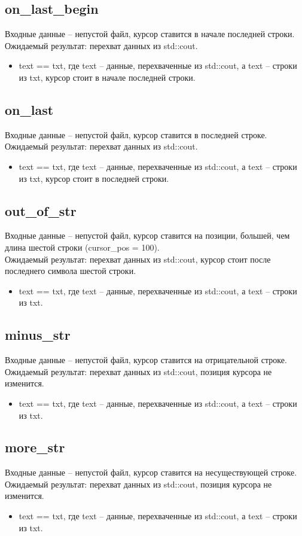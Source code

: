 \documentclass{article}
\begin{document}
\subsection{on\_last\_begin}
Входные данные -- непустой файл, курсор ставится в начале последней строки.\\
Ожидаемый результат: перехват данных из std::cout.
\begin{itemize}
    \item text == txt, где text -- данные, перехваченные из std::cout, а text -- строки из txt, курсор стоит в начале последней строки.
\end{itemize}
\subsection{on\_last}
Входные данные -- непустой файл, курсор ставится в последней строке.\\
Ожидаемый результат: перехват данных из std::cout.
\begin{itemize}
    \item text == txt, где text -- данные, перехваченные из std::cout, а text -- строки из txt, курсор стоит в последней строки.
\end{itemize}
\subsection{out\_of\_str}
Входные данные -- непустой файл, курсор ставится на позиции, большей, чем длина шестой строки (cursor\_pos = 100).\\
Ожидаемый результат: перехват данных из std::cout, курсор стоит после последнего символа шестой строки.
\begin{itemize}
    \item text == txt, где text -- данные, перехваченные из std::cout, а text -- строки из txt.
\end{itemize}
\subsection{minus\_str}
Входные данные -- непустой файл, курсор ставится на отрицательной строке.\\
Ожидаемый результат: перехват данных из std::cout, позиция курсора не изменится.
\begin{itemize}
    \item text == txt, где text -- данные, перехваченные из std::cout, а text -- строки из txt.
\end{itemize}
\subsection{more\_str}
Входные данные -- непустой файл, курсор ставится на несуществующей строке.\\
Ожидаемый результат: перехват данных из std::cout, позиция курсора не изменится.
\begin{itemize}
    \item text == txt, где text -- данные, перехваченные из std::cout, а text -- строки из txt.
\end{itemize}
\end{document}
